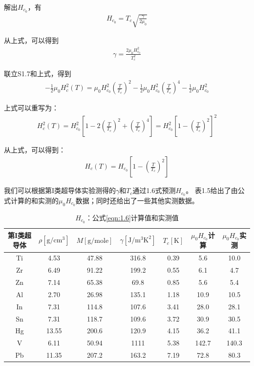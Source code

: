 解出$H_{c_0}$，有
\begin{align*}
H_{c_0}=T_c\sqrt{\frac{\gamma}{2\mu_0}}\tag{1.6}
\end{align*}

从上式，可以得到
\begin{align*}
\gamma=\frac{2\mu_0 H_{c_0}^2}{T_c^2}\tag{S1.9}
\end{align*}

联立S1.7和上式，得到
\begin{align*}
-\frac{1}{2}\mu_0 H_c^2(T)=\mu_0 H_{c_0}^2 \left(\frac{T}{T_c}\right)^2-\frac{1}{2}\mu_0 H_{c_0}^2 \left(\frac{T}{T_c}\right)^4-\frac{1}{2}\mu_0 H_{c_0}^2\tag{S1.10}
\end{align*}

上式可以重写为：
\begin{align*}
H_c^2(T)=H_{c_0}^2\left[1-2\left(\frac{T}{T_c}\right)^2+\left(\frac{T}{T_c}\right)^4\right]=H_{c_0}^2\left[1-\left(\frac{T}{T_c}\right)^2\right]^2\tag{S1.11}
\end{align*}

从上式，可以得到：
\begin{align*}
H_c(T)=H_{c_0}\left[1-\left(\frac{T}{T_c}\right)^2 \right]\tag{1.7}
\end{align*}

我们可以根据第I类超导体实验测得的$\gamma$和$T_c$通过1.6式预测$H_{c_0}$。
表1.5给出了由公式计算的和实测的$\mu_0 H_{c_0}$数据；同时还给出了一些其他实测数据。
\begin{table}[htbp]\small
  \centering
  \caption{$H_{c_0}$：公式\ref{eqn:1.6}计算值和实测值} \label{tb:eqn1.6andexp}
\begin{tabular}{|c||c|c|c|c|c|c|}
  \hline
第I类超导体&$\rho [\mathrm{g/cm^3}]$&$M [\mathrm{g/mole}]$&$\gamma [\mathrm{J/m^3K^2}]$&$T_c [\mathrm{K}]$&$\mu_0 H_{c_0}$计算&$\mu_0 H_{c_0}$实测 \\ \hline \hline
Ti&4.53&47.88&316.8&0.39&5.6&10.0 \\ \hline
Zr&6.49&91.22&199.2&0.55&6.1&4.7\\ \hline
Zn&7.14&65.38&69.8&0.85&5.6&5.4\\ \hline
Al&2.70&26.98&135.1&1.18&10.9&10.5\\ \hline
In&7.31&114.8&107.6&3.41&28.0&28.1\\  \hline
Sn&7.31&118.7&109.6&3.72&30.9&30.5\\  \hline
Hg&13.55&200.6&120.9&4.15&36.2&41.1\\  \hline
V&6.11&50.94&1111&5.38&142.7&140.3\\  \hline
Pb&11.35&207.2&163.2&7.19&72.8&80.3 \\  \hline
\end{tabular}
\end{table}

